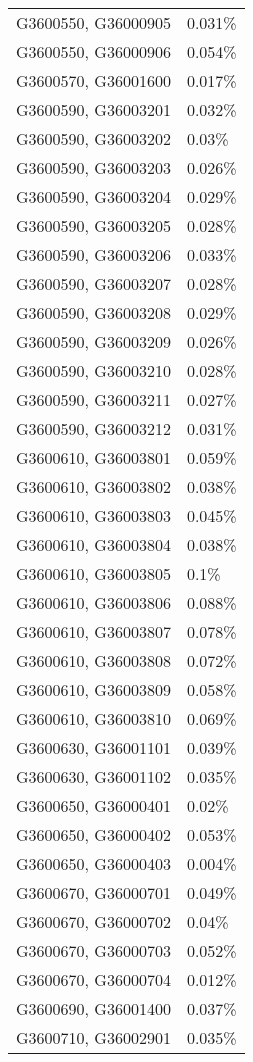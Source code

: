 \begin{longtable}[]{@{}ll@{}}
G3600550, G36000905 & 0.031\% \\
G3600550, G36000906 & 0.054\% \\
G3600570, G36001600 & 0.017\% \\
G3600590, G36003201 & 0.032\% \\
G3600590, G36003202 & 0.03\% \\
G3600590, G36003203 & 0.026\% \\
G3600590, G36003204 & 0.029\% \\
G3600590, G36003205 & 0.028\% \\
G3600590, G36003206 & 0.033\% \\
G3600590, G36003207 & 0.028\% \\
G3600590, G36003208 & 0.029\% \\
G3600590, G36003209 & 0.026\% \\
G3600590, G36003210 & 0.028\% \\
G3600590, G36003211 & 0.027\% \\
G3600590, G36003212 & 0.031\% \\
G3600610, G36003801 & 0.059\% \\
G3600610, G36003802 & 0.038\% \\
G3600610, G36003803 & 0.045\% \\
G3600610, G36003804 & 0.038\% \\
G3600610, G36003805 & 0.1\% \\
G3600610, G36003806 & 0.088\% \\
G3600610, G36003807 & 0.078\% \\
G3600610, G36003808 & 0.072\% \\
G3600610, G36003809 & 0.058\% \\
G3600610, G36003810 & 0.069\% \\
G3600630, G36001101 & 0.039\% \\
G3600630, G36001102 & 0.035\% \\
G3600650, G36000401 & 0.02\% \\
G3600650, G36000402 & 0.053\% \\
G3600650, G36000403 & 0.004\% \\
G3600670, G36000701 & 0.049\% \\
G3600670, G36000702 & 0.04\% \\
G3600670, G36000703 & 0.052\% \\
G3600670, G36000704 & 0.012\% \\
G3600690, G36001400 & 0.037\% \\
G3600710, G36002901 & 0.035\% \\

\end{longtable}

